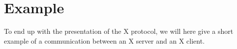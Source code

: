 \section{Example}
To end up with the presentation of the X protocol, we will here give a
short example of a communication between an X server and an X client.